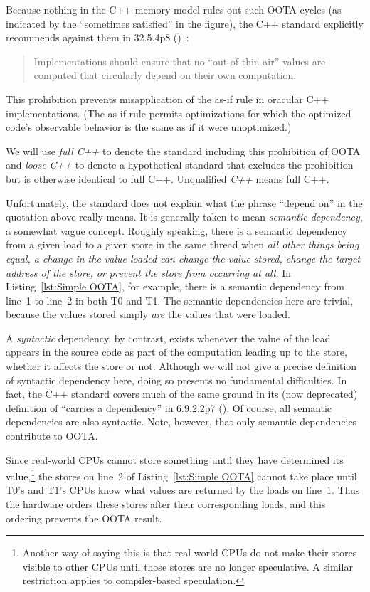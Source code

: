 Because nothing in the C++ memory model rules out such OOTA cycles
(as indicated by the ``sometimes satisfied'' in the figure), the C++
standard explicitly recommends against them in 32.5.4p8
()~\cite{ThomasKoeppe2025N5032}:
\begin{quote}
	Implementations should ensure that no ``out-of-thin-air'' values
	are computed that circularly depend on their own computation.
\end{quote}
This prohibition prevents misapplication of the as-if rule in oracular
C++ implementations.
(The as-if rule permits optimizations for which the optimized code's
observable behavior is the same as if it were unoptimized.)

We will use \emph{full C++} to denote the standard including this
prohibition of OOTA and \emph{loose C++} to denote a hypothetical standard
that excludes the prohibition but is otherwise identical to full C++.
Unqualified \emph{C++} means full C++.

Unfortunately, the standard does not explain what the phrase ``depend on''
in the quotation above really means.
It is generally taken to mean \emph{semantic dependency},
a somewhat vague concept.
Roughly speaking, there is a semantic dependency from a given load to
a given store in the same thread when
\emph{all other things being equal, a change in the
value loaded can change the value stored, change the target address of
the store, or prevent the store from occurring at all.}
In Listing~\ref{lst:Simple OOTA}, for example,
there is a semantic dependency from line~1 to line~2 in both T0 and T1.
The semantic dependencies here are trivial,
because the values stored simply \emph{are} the values that were loaded.

A \emph{syntactic} dependency, by contrast, exists whenever the value
of the load appears in the source code as part of the computation
leading up to the store, whether it affects the store or not.
Although we will not give a precise definition of syntactic dependency
here, doing so presents no fundamental difficulties.
In fact, the C++ standard covers much of the same ground in its
(now deprecated) definition
of ``carries a dependency'' in 6.9.2.2p7 ().
Of course, all semantic dependencies are also syntactic.
Note, however, that only semantic dependencies contribute to OOTA.

Since real-world CPUs cannot store something
until they have determined its value,\footnote{
	Another way of saying this is that real-world CPUs do not
	make their stores visible to other CPUs until those stores
	are no longer speculative.
	A similar restriction applies to compiler-based speculation.}
the stores on line~2 of Listing~\ref{lst:Simple OOTA}
cannot take place until T0's and T1's CPUs
know what values are returned by the loads on line~1.
Thus the hardware orders these stores after their corresponding loads,
and this ordering prevents the OOTA result.

